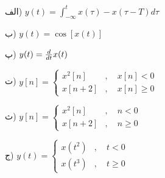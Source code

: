 \documentclass[10pt,letterpaper]{article}
\begin{document}
الف) 
$
y(t)=\int_{-\infty}^{t} x(\tau)-x(\tau-T)d\tau
$

ب) 
$
y(t)=\cos [x(t)]
$

پ) 
$
y(t)={d\over dt}x(t)
$

ت)
$
y[n]=\begin{cases}
x^2[n]&,\quad x[n]<0
\\
x[n+2]&,\quad x[n]\ge 0
\end{cases}
$

ث) 
$
y[n]=\begin{cases}
x^2[n]&,\quad n<0
\\
x[n+2]&,\quad n\ge 0
\end{cases}
$

ج)
$
y(t)=\begin{cases}
x(t^2)&,\quad t<0
\\
x(t^3)&,\quad t\ge 0
\end{cases}
$
\end{document}

